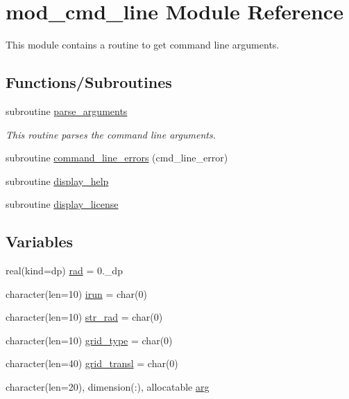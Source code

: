 \hypertarget{namespacemod__cmd__line}{}\section{mod\+\_\+cmd\+\_\+line Module Reference}
\label{namespacemod__cmd__line}


This module contains a routine to get command line arguments.  


\subsection*{Functions/\+Subroutines}
\begin{DoxyCompactItemize}
\item 
subroutine \hyperlink{namespacemod__cmd__line_af3e6d85ae8e1f68f4c7c22e40bd3f3bb}{parse\+\_\+arguments}
\begin{DoxyCompactList}\small\item\em This routine parses the command line arguments. \end{DoxyCompactList}\item 
subroutine \hyperlink{namespacemod__cmd__line_ad2ecb585bbedcf49bd8219c82d034147}{command\+\_\+line\+\_\+errors} (cmd\+\_\+line\+\_\+error)
\item 
subroutine \hyperlink{namespacemod__cmd__line_add2ef454c82fd88ce99ea2fa978b2e6f}{display\+\_\+help}
\item 
subroutine \hyperlink{namespacemod__cmd__line_a5836de50b766a84c4d341efc9a9bcee0}{display\+\_\+license}
\end{DoxyCompactItemize}
\subsection*{Variables}
\begin{DoxyCompactItemize}
\item 
real(kind=dp) \hyperlink{namespacemod__cmd__line_a726e623fa552ec6109d7f0e78545afe9}{rad} = 0.\+\_\+dp
\item 
character(len=10) \hyperlink{namespacemod__cmd__line_aae2bce3e1e50220133e7bd310a051881}{irun} = char(0)
\item 
character(len=10) \hyperlink{namespacemod__cmd__line_aa7def1b6cf5f62c8473902ef9fc7f307}{str\+\_\+rad} = char(0)
\item 
character(len=10) \hyperlink{namespacemod__cmd__line_ad92694e0caab203d3bc911dabb059271}{grid\+\_\+type} = char(0)
\item 
character(len=40) \hyperlink{namespacemod__cmd__line_aa1ebd20914c6804b19cef6f2f1f5b8b9}{grid\+\_\+transl} = char(0)
\item 
character(len=20), dimension(\+:), allocatable \hyperlink{namespacemod__cmd__line_a39002195e12526c3d97ff7ee81f9c00c}{arg}
\end{DoxyCompactItemize}


